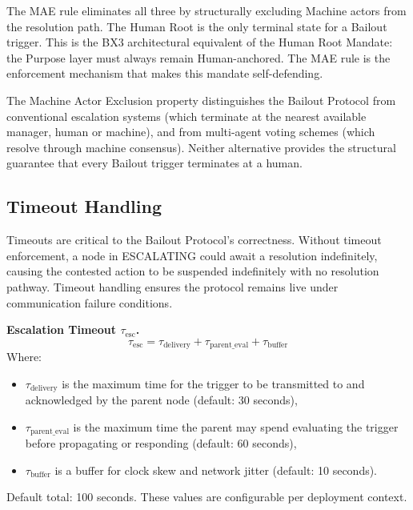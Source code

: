 The MAE rule eliminates all three by structurally excluding Machine actors from the resolution path. The Human Root is the only terminal state for a Bailout trigger. This is the BX3 architectural equivalent of the Human Root Mandate: the Purpose layer must always remain Human-anchored. The MAE rule is the enforcement mechanism that makes this mandate self-defending.

\bigskip
The Machine Actor Exclusion property distinguishes the Bailout Protocol from conventional escalation systems (which terminate at the nearest available manager, human or machine), and from multi-agent voting schemes (which resolve through machine consensus). Neither alternative provides the structural guarantee that every Bailout trigger terminates at a human.

\subsection{Timeout Handling}

Timeouts are critical to the Bailout Protocol's correctness. Without timeout enforcement, a node in ESCALATING could await a resolution indefinitely, causing the contested action to be suspended indefinitely with no resolution pathway. Timeout handling ensures the protocol remains live under communication failure conditions.

\bigskip
\noindent\textbf{Escalation Timeout $\tau_{\text{esc}}$.}
\begin{equation}
\tau_{\text{esc}} = \tau_{\text{delivery}} + \tau_{\text{parent\_eval}} + \tau_{\text{buffer}}
\end{equation}
Where:
\begin{itemize}
    \item $\tau_{\text{delivery}}$ is the maximum time for the trigger to be transmitted to and acknowledged by the parent node (default: 30 seconds),
    \item $\tau_{\text{parent\_eval}}$ is the maximum time the parent may spend evaluating the trigger before propagating or responding (default: 60 seconds),
    \item $\tau_{\text{buffer}}$ is a buffer for clock skew and network jitter (default: 10 seconds).
\end{itemize}
Default total: 100 seconds. These values are configurable per deployment context.

